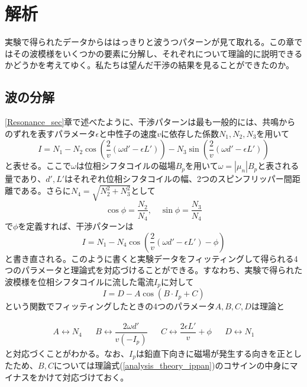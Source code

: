 \section{解析}
実験で得られたデータからははっきりと波うつパターンが見て取れる。この章ではその波模様をいくつかの要素に分解し、それぞれについて理論的に説明できるかどうかを考えてゆく。私たちは望んだ干渉の結果を見ることができたのか。

\subsection{波の分解}

\ref{Resonance_sec}章で述べたように、干渉パターンは最も一般的には、共鳴からのずれを表すパラメータ$\epsilon$と中性子の速度$v$に依存した係数$N_1,N_2,N_3$を用いて
\begin{equation}
I=N_1-N_2\cos\left(\frac{2}{v}(\omega d'-\epsilon L')\right) -N_3\sin\left(\frac{2}{v}(\omega d'-\epsilon L')\right) \label{analysis_theory_ippan}
\end{equation}
と表せる。ここで$\omega$は位相シフタコイルの磁場$B_p$を用いて$\omega=|\mu_n|B_p$と表される量であり、$d',L'$はそれぞれ位相シフタコイルの幅、2つのスピンフリッパー間距離である。さらに$N_4=\sqrt{N_2^2+N_3^2}$として
\begin{equation}
\cos \phi=\frac{N_2}{N_4}, \quad \sin \phi=\frac{N_3}{N_4}
\end{equation}
で$\phi$を定義すれば、干渉パターンは
\begin{equation}
I=N_1-N_4\cos\left(\frac{2}{v}(\omega d'-\epsilon L')-\phi\right)\label{analysis_theory_ippan2}
\end{equation}
と書き直される。このように書くと実験データをフィッティングして得られる4つのパラメータと理論式を対応づけることができる。すなわち、実験で得られた波模様を位相シフタコイルに流した電流$I_p$に対して
\begin{equation}
I=D-A\cos(B\cdot I_p+C)
\end{equation}
という関数でフィッティングしたときの4つのパラメータ$A,B,C,D$は理論と

\begin{align}
A \leftrightarrow N_4&&B \leftrightarrow \dfrac{2\omega d'}{v(-I_p)}&&C \leftrightarrow \dfrac{2\epsilon L'}{v} +\phi&&D \leftrightarrow N_1
\end{align}
と対応づくことがわかる。なお、$I_p$は鉛直下向きに磁場が発生する向きを正としたため、$B,C$については理論式(\ref{analysis_theory_ippan})のコサインの中身にマイナスをかけて対応づけておく。

